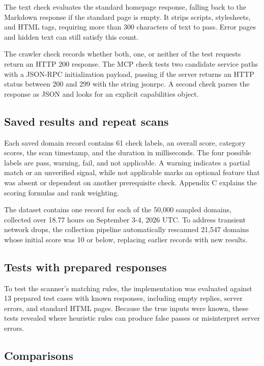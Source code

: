 \documentclass{article}
\begin{document}
The text check evaluates the standard homepage response, falling back to the Markdown response if the standard page is empty. It strips scripts, stylesheets, and HTML tags, requiring more than 300 characters of text to pass. Error pages and hidden text can still satisfy this count.

The crawler check records whether both, one, or neither of the test requests return an HTTP 200 response. The MCP check tests two candidate service paths with a JSON-RPC initialization payload, passing if the server returns an HTTP status between 200 and 299 with the string jsonrpc. A second check parses the response as JSON and looks for an explicit capabilities object.

\subsection{Saved results and repeat scans}

Each saved domain record contains 61 check labels, an overall score, category scores, the scan timestamp, and the duration in milliseconds. The four possible labels are pass, warning, fail, and not applicable. A warning indicates a partial match or an unverified signal, while not applicable marks an optional feature that was absent or dependent on another prerequisite check. Appendix C explains the scoring formulas and rank weighting.

The dataset contains one record for each of the 50,000 sampled domains, collected over 18.77 hours on September 3-4, 2026 UTC. To address transient network drops, the collection pipeline automatically rescanned 21,547 domains whose initial score was 10 or below, replacing earlier records with new results.

\subsection{Tests with prepared responses}

To test the scanner's matching rules, the implementation was evaluated against 13 prepared test cases with known responses, including empty replies, server errors, and standard HTML pages. Because the true inputs were known, these tests revealed where heuristic rules can produce false passes or misinterpret server errors.

\subsection{Comparisons}
\end{document}
